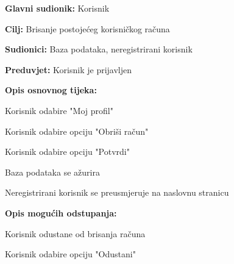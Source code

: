 					\noindent {}
					\begin{packed_item}
						
						\item \textbf{Glavni sudionik: }Korisnik
						\item  \textbf{Cilj:} Brisanje postojećeg korisničkog računa
						\item  \textbf{Sudionici:} Baza podataka, neregistrirani korisnik
						\item  \textbf{Preduvjet:} Korisnik je prijavljen
						\item  \textbf{Opis osnovnog tijeka:}
						
						\item[] \begin{packed_enum}
							
							\item Korisnik odabire "Moj profil"
							\item Korisnik odabire opciju "Obriši račun"
							\item Korisnik odabire opciju "Potvrdi"
							\item Baza podataka se ažurira
							\item Neregistrirani korisnik se preusmjeruje na naslovnu stranicu
						\end{packed_enum}
						
						\item  \textbf{Opis mogućih odstupanja:}
						
						\item[] \begin{packed_item}
							
							\item[3.a] Korisnik odustane od brisanja računa
							\item[] \begin{packed_enum}
								
								\item Korisnik odabire opciju "Odustani"
								
							\end{packed_enum}
							
						\end{packed_item}
					\end{packed_item}
					
